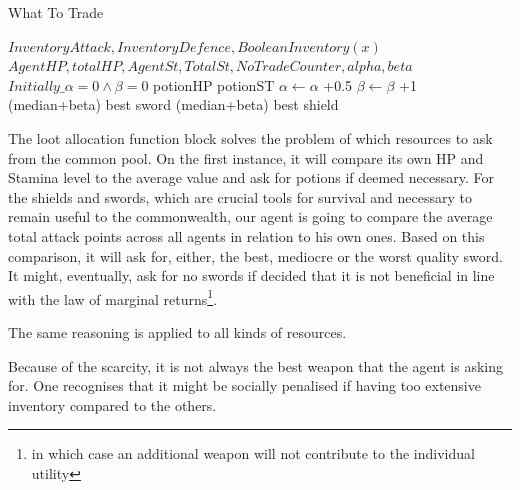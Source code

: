 \begin{algorithm}
\caption{What To Trade}\label{alg:30}
\begin{algorithmic} 
\scriptsize
\Require $InventoryAttack, InventoryDefence, Boolean Inventory(x)$
\Require $AgentHP, totalHP, AgentSt, TotalSt, NoTradeCounter,alpha, beta$
\Ensure $Initially\_\alpha = 0 \land \beta = 0$
\State 
\Return potionHP
\EndIf
{}
\State 
\Return potionST
\EndIf
{}
\State $\alpha \leftarrow \alpha$ +0.5
\State $\beta \leftarrow \beta$ +1
\EndIf
{}
\State 
\Return (median+beta) best sword 
\EndIf
{}
\State 
\Return (median+beta) best shield 
\EndIf
\end{algorithmic}
\end{algorithm}


The loot allocation function block solves the problem of which resources to ask from the common pool. On the first instance, it will compare its own HP and Stamina level to the average value and ask for potions if deemed necessary. For the shields and swords, which are crucial tools for survival and necessary to remain useful to the commonwealth, our agent is going to compare the average total attack points across all agents in relation to his own ones. Based on this comparison, it will ask for, either, the best, mediocre or the worst quality sword. It might, eventually, ask for no swords if decided that it is not beneficial in line with the law of marginal returns\footnote{in which case an additional weapon will not contribute to the individual utility}.

The same reasoning is applied to all kinds of resources.

Because of the scarcity, it is not always the best weapon that the agent is asking for. One recognises that it might be socially penalised if having too extensive inventory compared to the others.




